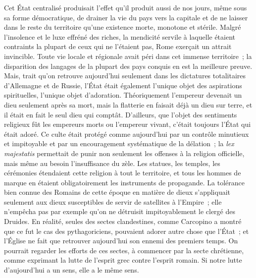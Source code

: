 \documentclass[french,twoside]{book} %
\begin{document}
Cet État centralisé produisait l'effet qu'il produit aussi de nos jours, même sous sa forme démocratique, de drainer la vie du pays vers la capitale et de ne laisser dans le reste du territoire qu'une existence morte, monotone et stérile. Malgré l'insolence et le luxe effréné des riches, la mendicité servile à laquelle étaient contraints la plupart de ceux qui ne l'étaient pas, Rome exerçait un attrait invincible. Toute vie locale et régionale avait péri dans cet immense territoire ; la disparition des langages de la plupart des pays conquis en est la meilleure preuve. Mais, trait qu'on retrouve aujourd'hui seulement dans les dictatures totalitaires d'Allemagne et de Russie, l'État était également l'unique objet des aspirations spirituelles, l'unique objet d'adoration. Théoriquement l'empereur devenait un dieu seulement après sa mort, mais la flatterie en faisait déjà un dieu sur terre, et il était en fait le seul dieu qui comptât. D'ailleurs, que l'objet des sentiments religieux fût les empereurs morts ou l'empereur vivant, c'était toujours l'État qui était adoré. Ce culte était protégé comme aujourd'hui par un contrôle minutieux et impitoyable et par un encou­ragement systématique de la délation ; la {\itshape lex majestatis} permettait de punir non seulement les offenses à la religion officielle, mais même au besoin l'insuffisance du zèle. Les statues, les temples, les cérémonies étendaient cette religion à tout le territoire, et tous les hommes de marque en étaient obligatoi­rement les instruments de propagande. La tolérance bien connue des Romains de cette époque en matière de dieux s'appliquait seulement aux dieux suscepti­bles de servir de satellites à l'Empire ; elle n'empêcha pas par exemple qu'on ne détruisit impitoyablement le clergé des Druides. En réalité, seules des sectes clandestines, comme Carcopino a montré que ce fut le cas des pytha­goriciens, pouvaient adorer autre chose que l'État ; et l'Église ne fait que retrouver aujourd'hui son ennemi des premiers temps. On pourrait regarder les efforts de ces sectes, à commencer par la secte chrétienne, comme exprimant la lutte de l'esprit grec contre l'esprit romain. Si notre lutte d'aujourd'hui a un sens, elle a le même sens.\par
\end{document}

